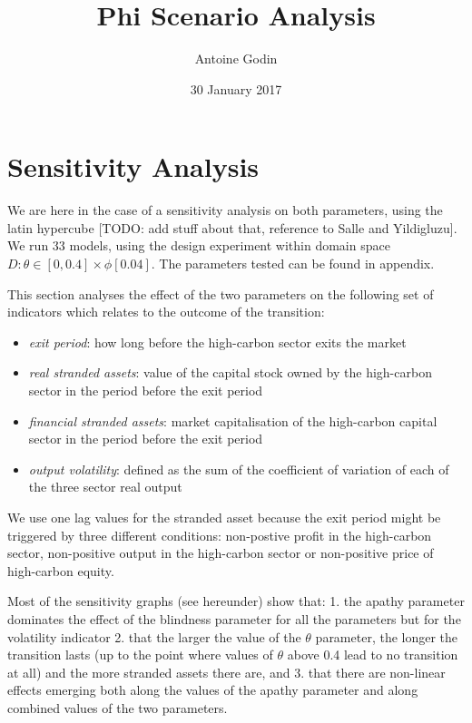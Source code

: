\documentclass[]{article}
\title{Phi Scenario Analysis}
\author{Antoine Godin}
\date{30 January 2017}
\providecommand{\tightlist}{%
  \setlength{\itemsep}{0pt}\setlength{\parskip}{0pt}}
\begin{document}
\maketitle

\section{Sensitivity Analysis}\label{sensitivity-analysis}

We are here in the case of a sensitivity analysis on both parameters,
using the latin hypercube {[}TODO: add stuff about that, reference to
Salle and Yildigluzu{]}. We run 33 models, using the design experiment
within domain space \(D:\theta \in [0,0.4] \times \phi [0.04]\). The
parameters tested can be found in appendix.

This section analyses the effect of the two parameters on the following
set of indicators which relates to the outcome of the transition:

\begin{itemize}
\tightlist
\item
  \emph{exit period}: how long before the high-carbon sector exits the
  market
\item
  \emph{real stranded assets}: value of the capital stock owned by the
  high-carbon sector in the period before the exit period
\item
  \emph{financial stranded assets}: market capitalisation of the
  high-carbon capital sector in the period before the exit period
\item
  \emph{output volatility}: defined as the sum of the coefficient of
  variation of each of the three sector real output
\end{itemize}

We use one lag values for the stranded asset because the exit period
might be triggered by three different conditions: non-postive profit in
the high-carbon sector, non-positive output in the high-carbon sector or
non-positive price of high-carbon equity.

Most of the sensitivity graphs (see hereunder) show that: 1. the apathy
parameter dominates the effect of the blindness parameter for all the
parameters but for the volatility indicator 2. that the larger the value
of the \(\theta\) parameter, the longer the transition lasts (up to the
point where values of \(\theta\) above 0.4 lead to no transition at all)
and the more stranded assets there are, and 3. that there are non-linear
effects emerging both along the values of the apathy parameter and along
combined values of the two parameters.
\end{document}
